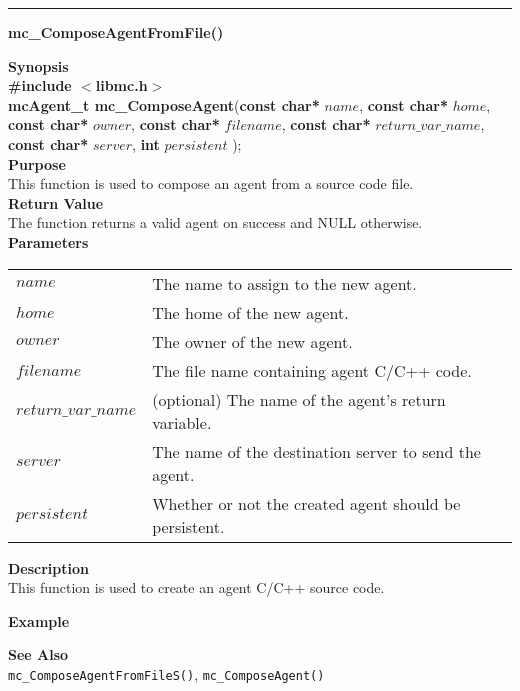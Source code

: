 \noindent
\vspace{5pt}
\rule{6.5in}{0.015in}
\noindent
{}
{\LARGE \bf mc\_ComposeAgentFromFile()}\\

\noindent
{\bf Synopsis}\\
{\bf \#include $<$libmc.h$>$}\\
{\bf mcAgent\_t mc\_ComposeAgent}({\bf const char*} $name$, 
                                  {\bf const char*} $home$,
                                  {\bf const char*} $owner$,
                                  {\bf const char*} $filename$,
                                  {\bf const char*} $return\_var\_name$,
                                  {\bf const char*} $server$,
                                  {\bf int} $persistent$
																	);\\

\noindent
{\bf Purpose}\\
This function is used to compose an agent from a source code file.\\

\noindent
{\bf Return Value}\\
The function returns a valid agent on success and NULL otherwise.\\

\noindent
{\bf Parameters}
\vspace{-0.1in}
\begin{description}
\item
\begin{tabular}{p{30 mm}p{125 mm}} 
$name$ & The name to assign to the new agent.\\
$home$ & The home of the new agent.\\
$owner$ & The owner of the new agent.\\
$filename$ & The file name containing agent C/C++ code.\\
$return\_var\_name$ & (optional) The name of the agent's return variable.\\
$server$ & The name of the destination server to send the agent.\\
$persistent$ & Whether or not the created agent should be persistent.\\
\end{tabular}
\end{description}

\noindent
{\bf Description}\\
This function is used to create an agent C/C++ source code. 

\noindent
{\bf Example}\\
\noindent
{\footnotesize}

\noindent
{\bf See Also}\\
\texttt{mc\_ComposeAgentFromFileS()}, \texttt{mc\_ComposeAgent()}

